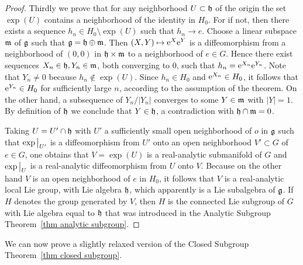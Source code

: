 \begin{proof}
    Thirdly we prove that for any neighborhood $U\subset\mathfrak{h}$ of the origin the set $\exp(U)$ contains a neighborhood of the identity in $H_0$. For if not, then there exists a sequence $h_n\in H_0\setminus \exp(U)$ such that $h_n\to e$. Choose a linear subspace $\mathfrak{m}$ of $\mathfrak{g}$ such that $\mathfrak{g}=\mathfrak{h}\oplus\mathfrak{m}$. Then $(X,Y)\mapsto \mathrm{e}^X \mathrm{e}^Y$ is a diffeomorphism from a neighborhood of $(0,0)$ in $\mathfrak{h}\times\mathfrak{m}$ to a neighborhood of $e\in G$. Hence there exist sequences $X_n\in\mathfrak{h}, Y_n\in\mathfrak{m}$, both converging to $0$, such that $h_n=\mathrm{e}^{X_n}\mathrm{e}^{Y_n}$. Note that $Y_n\neq 0$ because $h_n\notin \exp(U)$. Since $h_n\in H_0$ and $\mathrm{e}^{X_n}\in H_0$, it follows that $\mathrm{e}^{Y_n}\in H_0$ for sufficiently large $n$, according to the assumption of the theorem. On the other hand, a subsequence of $Y_n/|Y_n|$ converges to some $Y\in\mathfrak{m}$ with $|Y|=1$. By definition of $\mathfrak{h}$ we conclude that $Y\in\mathfrak{h}$, a contradiction with $\mathfrak{h}\cap\mathfrak{m}=0$.

    Taking $U=U'\cap \mathfrak{h}$ with $U'$ a sufficiently small open neighborhood of $o$ in $\mathfrak{g}$ such that $\restr{\exp}{U'}$ is a diffeomorphism from $U'$ onto an open neighborhood $V'\subset G$ of $e\in G$, one obtains that $V=\exp(U)$ is a real-analytic submanifold of $G$ and $\restr{\exp}{U}$ is a real-analytic diffeomorphism from $U$ onto $V$. Because on the other hand $V$ is an open neighborhood of $e$ in $H_0$, it follows that $V$ is a real-analytic local Lie group, with Lie algebra $\mathfrak{h}$, which apparently is a Lie subalgebra of $\mathfrak{g}$. If $H$ denotes the group generated by $V$, then $H$ is the connected Lie subgroup of $G$ with Lie algebra equal to $\mathfrak{h}$ that was introduced in the Analytic Subgroup Theorem~\ref{thm analytic subgroup}.
\end{proof}

We can now prove a slightly relaxed version of the Closed Subgroup Theorem~\ref{thm closed subgroup}.

